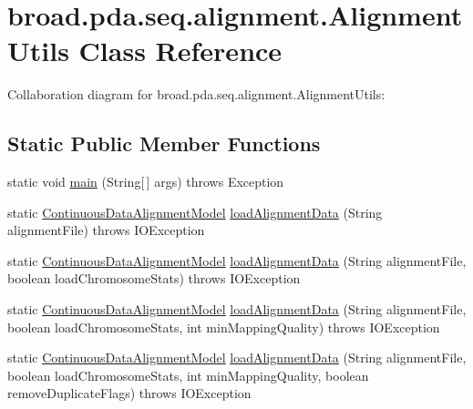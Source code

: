 \hypertarget{classbroad_1_1pda_1_1seq_1_1alignment_1_1_alignment_utils}{\section{broad.\+pda.\+seq.\+alignment.\+Alignment\+Utils Class Reference}
\label{classbroad_1_1pda_1_1seq_1_1alignment_1_1_alignment_utils}
}


Collaboration diagram for broad.\+pda.\+seq.\+alignment.\+Alignment\+Utils\+:
\subsection*{Static Public Member Functions}
\begin{DoxyCompactItemize}
\item 
static void \hyperlink{classbroad_1_1pda_1_1seq_1_1alignment_1_1_alignment_utils_a50fe3d7fac421c85d50a737755922da6}{main} (String\mbox{[}$\,$\mbox{]} args)  throws Exception 
\item 
static \hyperlink{classbroad_1_1pda_1_1seq_1_1segmentation_1_1_continuous_data_alignment_model}{Continuous\+Data\+Alignment\+Model} \hyperlink{classbroad_1_1pda_1_1seq_1_1alignment_1_1_alignment_utils_a01f53b98811de06325a819ab01cfbfc3}{load\+Alignment\+Data} (String alignment\+File)  throws I\+O\+Exception 
\item 
static \hyperlink{classbroad_1_1pda_1_1seq_1_1segmentation_1_1_continuous_data_alignment_model}{Continuous\+Data\+Alignment\+Model} \hyperlink{classbroad_1_1pda_1_1seq_1_1alignment_1_1_alignment_utils_a5b9a1f05e9bf43422e95723e0f5b1008}{load\+Alignment\+Data} (String alignment\+File, boolean load\+Chromosome\+Stats)  throws I\+O\+Exception 
\item 
static \hyperlink{classbroad_1_1pda_1_1seq_1_1segmentation_1_1_continuous_data_alignment_model}{Continuous\+Data\+Alignment\+Model} \hyperlink{classbroad_1_1pda_1_1seq_1_1alignment_1_1_alignment_utils_a3f38eadc7a254793812d0223e325fca2}{load\+Alignment\+Data} (String alignment\+File, boolean load\+Chromosome\+Stats, int min\+Mapping\+Quality)  throws I\+O\+Exception 
\item 
static \hyperlink{classbroad_1_1pda_1_1seq_1_1segmentation_1_1_continuous_data_alignment_model}{Continuous\+Data\+Alignment\+Model} \hyperlink{classbroad_1_1pda_1_1seq_1_1alignment_1_1_alignment_utils_a22bf5bebedcbaad5461419a3b9476fc9}{load\+Alignment\+Data} (String alignment\+File, boolean load\+Chromosome\+Stats, int min\+Mapping\+Quality, boolean remove\+Duplicate\+Flags)  throws I\+O\+Exception 

\end{DoxyCompactItemize}
